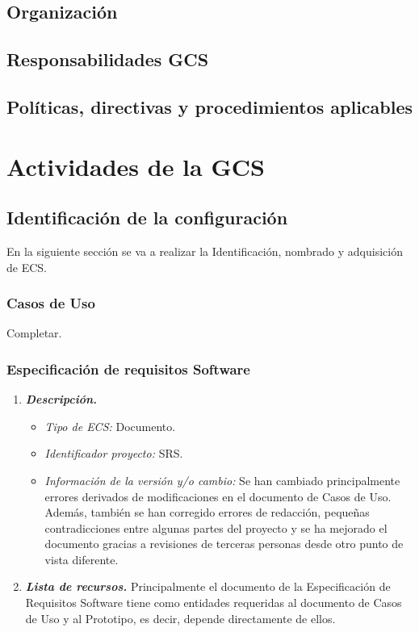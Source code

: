 \documentclass[11pt, a4paper, twoside, titlepage]{article}
\begin{document}
		\subsection{Organización}
		\subsection{Responsabilidades GCS}
		\subsection{Políticas, directivas y procedimientos aplicables}
	\section{Actividades de la GCS}
		\subsection{Identificación de la configuración} %
			En la siguiente sección se va a realizar la Identificación, nombrado y adquisición de \gls{ECS}.

			\subsubsection{Casos de Uso}
				Completar.

			\subsubsection{Especificación de requisitos Software}

				\begin{enumerate}
					\item {\itshape \bfseries Descripción.}
						\begin{itemize}
							\item \textit{Tipo de ECS:} Documento.
							\item \textit{Identificador proyecto:} SRS.
							\item \textit{Información de la versión y/o cambio:} Se han cambiado principalmente errores derivados de modificaciones en el documento de Casos de Uso. Además, también se han corregido errores de redacción, pequeñas contradicciones entre algunas partes del proyecto y se ha mejorado el documento gracias a revisiones de terceras personas desde otro punto de vista diferente.
						\end{itemize}

					\item {\itshape \bfseries Lista de recursos.}
						Principalmente el documento de la Especificación de Requisitos Software tiene como entidades requeridas al documento de Casos de Uso y al Prototipo, es decir, depende directamente de ellos.
				\end{enumerate}
\end{document}
